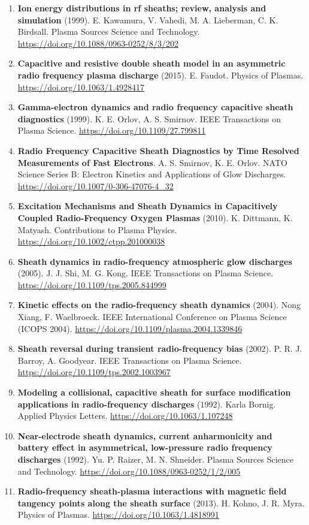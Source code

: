 \documentclass[11pt,a4paper]{article}
\begin{document}
\begin{enumerate}[leftmargin=1.4em]
\item \textbf{Ion energy distributions in rf sheaths; review, analysis and simulation} (1999). E. Kawamura, V. Vahedi, M. A. Lieberman, C. K. Birdsall. Plasma Sources Science and Technology. \url{https://doi.org/10.1088/0963-0252/8/3/202}
\item \textbf{Capacitive and resistive double sheath model in an asymmetric radio frequency plasma discharge} (2015). E. Faudot. Physics of Plasmas. \url{https://doi.org/10.1063/1.4928417}
\item \textbf{Gamma-electron dynamics and radio frequency capacitive sheath diagnostics} (1999). K. E. Orlov, A. S. Smirnov. IEEE Transactions on Plasma Science. \url{https://doi.org/10.1109/27.799811}
\item \textbf{Radio Frequency Capacitive Sheath Diagnostics by Time Resolved Measurements of Fast Electrons}. A. S. Smirnov, K. E. Orlov. NATO Science Series B: Electron Kinetics and Applications of Glow Discharges. \url{https://doi.org/10.1007/0-306-47076-4_32}
\item \textbf{Excitation Mechanisms and Sheath Dynamics in Capacitively Coupled Radio-Frequency Oxygen Plasmas} (2010). K. Dittmann, K. Matyash. Contributions to Plasma Physics. \url{https://doi.org/10.1002/ctpp.201000038}
\item \textbf{Sheath dynamics in radio-frequency atmospheric glow discharges} (2005). J. J. Shi, M. G. Kong. IEEE Transactions on Plasma Science. \url{https://doi.org/10.1109/tps.2005.844999}
\item \textbf{Kinetic effects on the radio-frequency sheath dynamics} (2004). Nong Xiang, F. Waelbroeck. IEEE International Conference on Plasma Science (ICOPS 2004). \url{https://doi.org/10.1109/plasma.2004.1339846}
\item \textbf{Sheath reversal during transient radio-frequency bias} (2002). P. R. J. Barroy, A. Goodyear. IEEE Transactions on Plasma Science. \url{https://doi.org/10.1109/tps.2002.1003967}
\item \textbf{Modeling a collisional, capacitive sheath for surface modification applications in radio-frequency discharges} (1992). Karla Bornig. Applied Physics Letters. \url{https://doi.org/10.1063/1.107248}
\item \textbf{Near-electrode sheath dynamics, current anharmonicity and battery effect in asymmetrical, low-pressure radio frequency discharges} (1992). Yu. P. Raizer, M. N. Shneider. Plasma Sources Science and Technology. \url{https://doi.org/10.1088/0963-0252/1/2/005}
\item \textbf{Radio-frequency sheath-plasma interactions with magnetic field tangency points along the sheath surface} (2013). H. Kohno, J. R. Myra. Physics of Plasmas. \url{https://doi.org/10.1063/1.4818991}

\end{enumerate}
\end{document}
